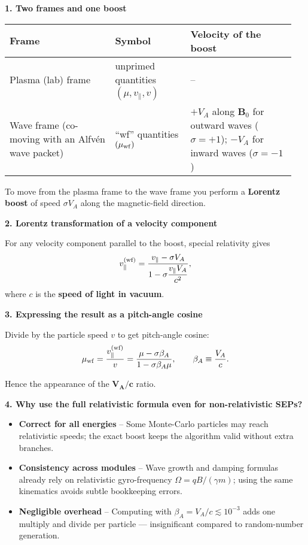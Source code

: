 \begin{tcolorbox}[colback=white, colframe=black, title={Why Does the Frame‐Change Formula Use $V_A/c$ Instead of Just $V_A$?}]

\textbf{1. Two frames and one boost}

\medskip

\begin{tabular}{@{}p{0.35\linewidth} p{0.25\linewidth} p{0.35\linewidth}@{}}
\toprule
\textbf{Frame} & \textbf{Symbol} & \textbf{Velocity of the boost} \\
\midrule
Plasma (lab) frame & unprimed quantities $(\mu, v_\parallel, v)$ & -- \\
Wave frame (co-moving with an Alfvén wave packet) & ``wf'' quantities $(\mu_{\rm wf})$ & $+V_A$ along $\mathbf{B}_0$ for outward waves ($\sigma = +1$); $-V_A$ for inward waves ($\sigma = -1$) \\
\bottomrule
\end{tabular}

\medskip

To move from the plasma frame to the wave frame you perform a \textbf{Lorentz boost} of speed $\sigma V_A$ along the magnetic-field direction.

\medskip

\textbf{2. Lorentz transformation of a velocity component}

\medskip

For any velocity component parallel to the boost, special relativity gives
\[
v_\parallel^{\rm(wf)} = \frac{v_\parallel - \sigma V_A}{1 - \sigma \dfrac{v_\parallel V_A}{c^2}},
\]
where $c$ is the \textbf{speed of light in vacuum}.

\medskip

\textbf{3. Expressing the result as a pitch-angle cosine}

\medskip

Divide by the particle speed $v$ to get pitch-angle cosine:
\[
\mu_{\rm wf}
= \frac{v_\parallel^{\rm(wf)}}{v}
= \frac{\mu - \sigma \beta_A}{1 - \sigma \beta_A \mu}, 
\qquad 
\beta_A \equiv \frac{V_A}{c}.
\]

Hence the appearance of the $\boldsymbol{V_A/c}$ ratio.

\medskip

\textbf{4. Why use the full relativistic formula even for non-relativistic SEPs?}

\begin{itemize}
    \item \textbf{Correct for all energies} – Some Monte-Carlo particles may reach relativistic speeds; the exact boost keeps the algorithm valid without extra branches.
    \item \textbf{Consistency across modules} – Wave growth and damping formulas already rely on relativistic gyro-frequency $\Omega = qB/(\gamma m)$; using the same kinematics avoids subtle bookkeeping errors.
    \item \textbf{Negligible overhead} – Computing with $\beta_A = V_A/c \lesssim 10^{-3}$ adds one multiply and divide per particle — insignificant compared to random-number generation.
\end{itemize}


\end{tcolorbox}
